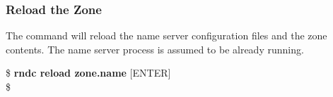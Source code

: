 
\subsubsection{Reload the Zone}

The  command will reload the name server configuration files and
the zone contents.  The name server process is assumed to be already running.

\begin{tabbing}
\hspace{0.5in}\$ {\bf rndc reload zone.name} $[$ENTER$]$ \\
\hspace{0.5in}\$ \\
\end{tabbing}
